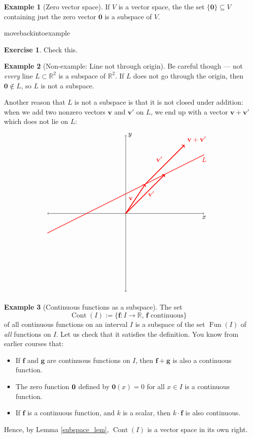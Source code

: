 \documentclass[a4paper,11pt]{book}
\theoremstyle{definition}
\newtheorem{exercise}{Exercise}
\newtheorem{example_environment}{Example}[chapter]
\newcommand{\be}{\begin{equation}}
\newcommand{\ee}{\end{equation}}
\newcommand{\ba}{\begin{aligned}}
\newcommand{\ea}{\end{aligned}}
\newcommand{\ve}[1]{\mathbf{#1}}
\newenvironment{example}
	{
		\begin{oframed} 
		\begin{example_environment}
	}
	{
		\end{example_environment}
		\end{oframed}
	}
\DeclareMathOperator{\Fun}{Fun}
\DeclareMathOperator{\Cont}{Cont}
\begin{document}
\begin{example}[Zero vector space] If $V$ is a vector space, the the set $
\{\ve{0}\} \subseteq V$ containing just the zero vector $\ve{0}$ is a subspace of $V$.

\end{example}
movebackintoexample
\begin{exercise} Check this.
\end{exercise}
\begin{example}[Non-example: Line not through origin] Be careful though --- not {\em every} line $L \subset \mathbb{R}^2$ is a subspace of $\mathbb{R}^2$. If $L$ does not go through the origin, then $\ve{0} \notin L$, so $L$ is not a subspace. 

Another reason that $L$ is not a subspace is that it is not closed under addition: when we add two nonzero vectors $\ve{v}$ and $\ve{v}'$ on $L$, we end up with a vector $\ve{v} + \ve{v}'$ which does not lie on $L$:
\be \label{pic_of_bad_L}
\ba
\begin{tikzpicture}[scale=2]
	\draw[<->] (-2, 0) -- (2,0) node[below] {$x$};
	\draw[<->] (0, -2) -- (0, 2) node[right] {$y$};
	\draw[thick, red] (-2, -0.5) -- (2, 1.5) node[below] {$L$};
	\draw[very thick, red, ->] (0,0) -- node[left] {$\ve{v}$} (0.5, 0.75);
	\draw[very thick, red, ->] (0,0) -- node[right] {$\ve{v}'$} (1, 1);
	\draw[very thick, red, ->] (0.5,0.75) -- node[above left] {$\ve{v}'$} (1.5, 1.75) node[above right] {$\ve{v} + \ve{v}'$};
\end{tikzpicture}
\ea
\ee
\end{example}



\begin{example}[Continuous functions as a subspace] The set 
\[
 \Cont(I) := \{ \ve{f}: I \rightarrow \mathbb{R}, \, \ve{f} \mbox{ continuous} \}
 \]
of all continuous functions on an interval $I$ is a subspace of the set $\Fun(I)$ of {\em all} functions on $I$. Let us check that it satisfies the definition. You know from earlier courses that:
\begin{itemize}
\item If $\ve{f}$ and $\ve{g}$ are continuous functions on $I$, then $\ve{f} + \ve{g}$ is also a continuous function. 
\item The zero function $\bf{0}$ defined by $\ve{0}(x) = 0$ for all $x \in I$ is a continuous function.
\item If $\ve{f}$ is a continuous function, and $k$ is a scalar, then $k \cdot \ve{f}$ is also continuous.
\end{itemize}
Hence, by Lemma \ref{subspace_lem}, $\Cont(I)$ is a vector space in its own right.
\end{example}
\end{document}
